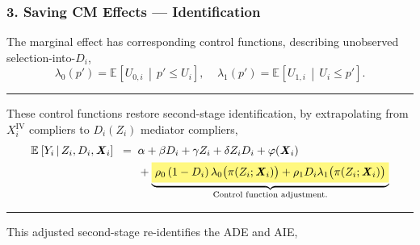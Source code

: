 \documentclass[dvipsnames]{beamer} %
\renewcommand{\vec}[1]{\boldsymbol{\mathit{#1}}}                           %
\newcommand{\E}[2][]{\mathbb{E}_{#1} \left[ #2 \right]}                    %
\newcommand{\Egiven}[3][]{\mathbb{E}_{#1} \left[ #2 \, \middle\vert \, #3 \right]} %
\renewcommand{\bar}[1]{\overline{#1}}                                      %
\newcommand{\eqhighlight}[2]{\colorbox{#1!50}{$\displaystyle#2$}}
\begin{document}
\begin{frame}
    \frametitle{3. Saving CM Effects --- Identification}
    The marginal effect has corresponding control functions, describing unobserved selection-into-$D_i$,
    \[ \lambda_0(p') = \Egiven{ U_{0,i} }{ p' \leq U_i }, \;\;\;\;
        \lambda_1(p') = \Egiven{ U_{1,i} }{ U_i \leq p' }. \]

    \vskip-0.25cm
    \par\noindent\rule{\textwidth}{0.4pt}
    These control functions restore second-stage identification, by extrapolating from $\vec X_i^{\text{IV}}$ compliers to $D_i(Z_i)$ mediator compliers,
    \begin{align*}
        \Egiven{Y_i}{Z_i, D_i, \vec X_i} \;\; =& \;\;
            \alpha
            + \beta D_i
            + \gamma Z_i
            + \delta Z_i D_i
            + \varphi(\vec X_i) \\
            & \;\; + \underbrace{\eqhighlight{yellow}{
                \rho_0 \left( 1 - D_i \right) \lambda_0 \big( \pi(Z_i ; \vec X_i) \big)
                + \rho_1 D_i \lambda_1 \big( \pi(Z_i ; \vec X_i) \big)}}_{
                    \text{Control function adjustment.}}
    \end{align*}


    \par\noindent\rule{\textwidth}{0.4pt}
    This adjusted second-stage re-identifies the ADE and AIE,
    
    \makebox[\textwidth]{\parbox{1.25\textwidth}{
        \small
        \[ \text{ADE}
            = \E{\gamma + \delta D_i},
        \text{ AIE}
            = \mathbb E \Bigg[ \, \bar \pi \,
                \Big( \beta +  \delta Z_i +
                    \underbrace{ (\rho_1 - \rho_0) \,
                    \Gamma \big(\pi(0; \vec X_i), \, \pi(1; \vec X_i) \big)}_{
                        \text{Mediator compliers extrapolation.}} \Big) \Bigg] \]
    }}
\end{frame}
\end{document}
